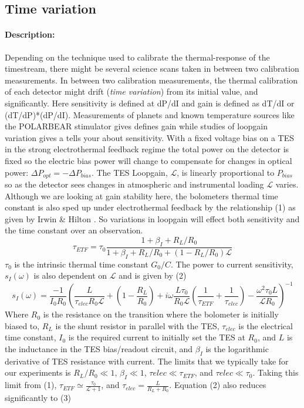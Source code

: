 \subsection{Time variation}

\paragraph{Description:}
Depending on the technique used to calibrate the thermal-response of the timestream, there might be several science scans taken in between two calibration measurements. 
In between two calibration measurements, the thermal calibration of each detector might drift (\emph{time variation}) from its initial value, and significantly. Here sensitivity is defined at dP/dI and gain is defined as dT/dI or (dT/dP)*(dP/dI). Measurements of planets and known temperature sources like the POLARBEAR stimulator gives defines gain while studies of loopgain variation gives a tells your about sensitivity. With a fixed voltage bias on a TES in the strong electrothermal feedback regime the total power on the detector is fixed so the electric bias power will change to compensate for changes in optical power: $\Delta P_{opt}=-\Delta P_{bias}$. The TES Loopgain, $\mathcal{L}$, is linearly proportional to $P_{bias}$ so as the detector sees changes in atmospheric and instrumental loading $\mathcal{L}$ varies. Although we are looking at gain stability here, the bolometers thermal time constant is also sped up under electrothermal feedback by the relationship (1) as given by Irwin \& Hilton \cite{TES_Bible}. So variations in loopgain will effect both sensitivity and the time constant over an observation.
\begin{equation}
\tau_{ETF}=\tau_0\frac{1+\beta_I+R_L/R_0}{1+\beta_I+R_L/R_0+(1-R_L/R_0)\mathcal{L}}
\end{equation}
$\tau_0$ is the intrinsic thermal time constant $G_0/C$. The power to current sensitivity, $s_I(\omega)$ is also dependent on $\mathcal{L}$ and is given by (2)
\begin{equation}
s_I(\omega)=\frac{-1}{I_0R_0}\left(\frac{L}{\tau_{elec}R_0\mathcal{L}}+(1-\frac{R_L}{R_0})+i\omega\frac{L\tau_0}{R_0\mathcal{L}}(\frac{1}{\tau_{ETF}}+\frac{1}{\tau_{elec}})-\frac{\omega^2\tau_0L}{\mathcal{L}R_0}\right)^{-1}
\end{equation}
Where $R_0$ is the resistance on the transition where the bolometer is initially biased to, $R_L$ is the shunt resistor in parallel with the TES, $\tau_{elec}$ is the electrical time constant, $I_0$ is the required current to initially set the TES at $R_0$, and $L$ is the inductance in the TES bias/readout circuit, and $\beta_I$ is the logarithmic derivative of TES resistance with current. The limits that we typically take for our experiments is $R_L/R_0 \ll 1$, $\beta_I \ll 1$, $\tau{elec} \ll \tau_{ETF}$, and $\tau{elec} \ll \tau_0$. Taking this limit from (1), $\tau_{ETF} \simeq \frac{\tau_0}{\mathcal{L}+1}$, and $\tau_{elec} = \frac{L}{R_L+R_0}$. Equation (2) also reduces  significantly to (3)
